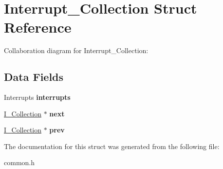 \hypertarget{struct_interrupt___collection}{}\section{Interrupt\+\_\+\+Collection Struct Reference}
\label{struct_interrupt___collection}


Collaboration diagram for Interrupt\+\_\+\+Collection\+:
\subsection*{Data Fields}
\begin{DoxyCompactItemize}
\item 
Interrupts {\bfseries interrupts}\hypertarget{struct_interrupt___collection_ab342d93ebde06a9e9d859f79b5d2b6f9}{}\label{struct_interrupt___collection_ab342d93ebde06a9e9d859f79b5d2b6f9}

\item 
\hyperlink{struct_interrupt___collection}{I\+\_\+\+Collection} $\ast$ {\bfseries next}\hypertarget{struct_interrupt___collection_a7d253fc5e51eae3defa6513b6249abb5}{}\label{struct_interrupt___collection_a7d253fc5e51eae3defa6513b6249abb5}

\item 
\hyperlink{struct_interrupt___collection}{I\+\_\+\+Collection} $\ast$ {\bfseries prev}\hypertarget{struct_interrupt___collection_adb843227cc331b7ed44724902deca22f}{}\label{struct_interrupt___collection_adb843227cc331b7ed44724902deca22f}

\end{DoxyCompactItemize}


The documentation for this struct was generated from the following file\+:\begin{DoxyCompactItemize}
\item 
common.\+h\end{DoxyCompactItemize}
